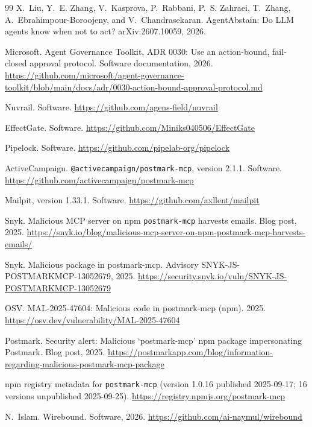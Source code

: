 \documentclass[10pt,twocolumn]{article}
\makeatletter
\newcommand{\code}[1]{\texttt{#1}}
\DeclareRobustCommand{\pmmcp}{\texttt{@activecampaign/\allowbreak postmark-\allowbreak mcp}}
\makeatother
\begin{document}
\begin{thebibliography}{99}
 X.~Liu, Y.~E. Zhang, V.~Kasprova, P.~Rabbani, P.~S. Zahraei, T.~Zhang, A.~Ebrahimpour-Boroojeny, and V.~Chandrasekaran. AgentAbstain: Do LLM agents know when not to act? arXiv:2607.10059, 2026.

 Microsoft. Agent Governance Toolkit, ADR 0030: Use an action-bound, fail-closed approval protocol. Software documentation, 2026. \url{https://github.com/microsoft/agent-governance-toolkit/blob/main/docs/adr/0030-action-bound-approval-protocol.md}

 Nuvrail. Software. \url{https://github.com/agens-field/nuvrail}

 EffectGate. Software. \url{https://github.com/Miniks040506/EffectGate}

 Pipelock. Software. \url{https://github.com/pipelab-org/pipelock}

 ActiveCampaign. \pmmcp{}, version 2.1.1. Software. \url{https://github.com/activecampaign/postmark-mcp}

 Mailpit, version 1.33.1. Software. \url{https://github.com/axllent/mailpit}

 Snyk. Malicious MCP server on npm \code{postmark-mcp} harvests emails. Blog post, 2025. \url{https://snyk.io/blog/malicious-mcp-server-on-npm-postmark-mcp-harvests-emails/}

 Snyk. Malicious package in postmark-mcp. Advisory SNYK-JS-POSTMARKMCP-13052679, 2025. \url{https://security.snyk.io/vuln/SNYK-JS-POSTMARKMCP-13052679}

 OSV. MAL-2025-47604: Malicious code in postmark-mcp (npm). 2025. \url{https://osv.dev/vulnerability/MAL-2025-47604}

 Postmark. Security alert: Malicious `postmark-mcp' npm package impersonating Postmark. Blog post, 2025. \url{https://postmarkapp.com/blog/information-regarding-malicious-postmark-mcp-package}

 npm registry metadata for \code{postmark-mcp} (version 1.0.16 published 2025-09-17; 16 versions unpublished 2025-09-25). \url{https://registry.npmjs.org/postmark-mcp}

 N.~Islam. Wirebound. Software, 2026. \url{https://github.com/ai-naymul/wirebound}

\end{thebibliography}
\end{document}
